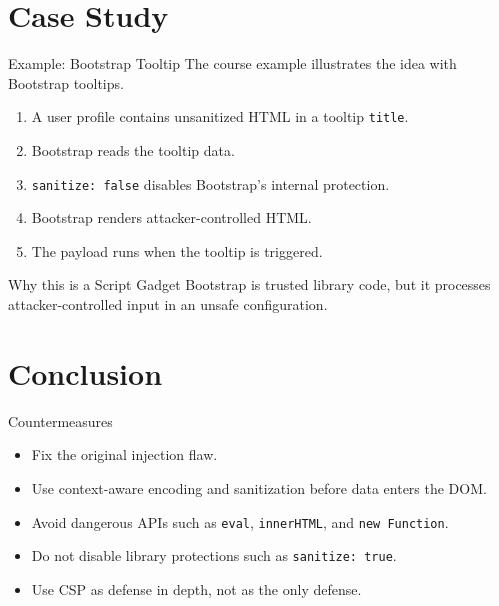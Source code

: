 \documentclass[%
font=nexus,
aspectratio=169,
language=english
]{tubsCD/tubscd}
\begin{document}

\section{Case Study}

\begin{frame}{Example: Bootstrap Tooltip}
The course example \cite{friendsDemo2026} illustrates the idea with Bootstrap tooltips.

\vspace{0.7em}

\begin{enumerate}
\item A user profile contains unsanitized HTML in a tooltip \texttt{title}.
\item Bootstrap reads the tooltip data.
\item \texttt{sanitize: false} disables Bootstrap's internal protection.
\item Bootstrap renders attacker-controlled HTML.
\item The payload runs when the tooltip is triggered.
\end{enumerate}

\vspace{0.7em}

\begin{block}{Why this is a Script Gadget}
Bootstrap is trusted library code, but it processes attacker-controlled input in an unsafe configuration.
\end{block}
\end{frame}


\section{Conclusion}

\begin{frame}{Countermeasures}
\begin{itemize}
\item Fix the original injection flaw.
\item Use context-aware encoding and sanitization before data enters the DOM.
\item Avoid dangerous APIs such as \texttt{eval}, \texttt{innerHTML}, and \texttt{new Function}.
\item Do not disable library protections such as \texttt{sanitize: true}.
\item Use CSP as defense in depth, not as the only defense.
\end{itemize}
\end{frame}
\end{document}
